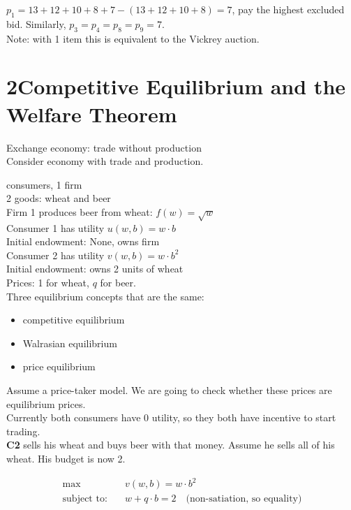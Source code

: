 \documentclass{article}
\begin{document}
\noindent
$p_1=13+12+10+8+7-(13+12+10+8)=7$, pay the highest excluded bid. Similarly, $p_3=p_4=p_8=p_9=7$.\\

\noindent
Note: with 1 item this is equivalent to the Vickrey auction.

\section*{2\quad Competitive Equilibrium and the Welfare Theorem}
Exchange economy: trade without production\\
Consider economy with trade and production.

 consumers, 1 firm\\
2 goods: wheat and beer\\

\noindent
Firm 1 produces beer from wheat: $f(w)=\sqrt{w}$\\

\noindent
Consumer 1 has utility $u(w,b)=w\cdot b$\\
Initial endowment: None, owns firm\\

\noindent
Consumer 2 has utility $v(w,b)=w\cdot b^2$\\
Initial endowment: owns 2 units of wheat\\

\noindent
Prices: 1 for wheat, $q$ for beer.\\

\noindent
Three equilibrium concepts that are the same:
\begin{itemize}
    \item competitive equilibrium
    \item Walrasian equilibrium
    \item price equilibrium
\end{itemize}

\noindent
Assume a price-taker model. We are going to check whether these prices are equilibrium prices.\\

\noindent
Currently both consumers have 0 utility, so they both have incentive to start trading.\\

\noindent
\textbf{C2} sells his wheat and buys beer with that money. Assume he sells all of his wheat. His budget is now 2.

\begin{equation*}
    \begin{aligned}
        \max\quad &v(w,b)=w\cdot b^2\\
        \text{subject to:}\quad&w + q\cdot b = 2\quad\text{(non-satiation, so equality)}
    \end{aligned}
\end{equation*}\\
\end{document}
